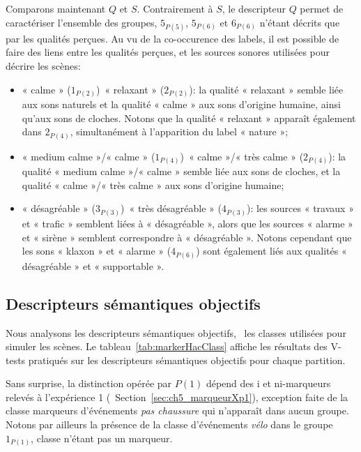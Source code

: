Comparons maintenant $Q$ et $S$. Contrairement à $S$, le descripteur $Q$ permet de caractériser l'ensemble des groupes,  $5_{P(5)}$,  $5_{P(6)}$ et  $6_{P(6)}$ n'étant décrits que par les qualités perçues. Au vu de la co-occurence des labels, il est possible de faire des liens entre les qualités perçues, et les sources sonores utilisées pour décrire les scènes:


\begin{itemize}
\item « calme » ($1_{P(2)}$)~\vs « relaxant » ($2_{P(2)}$): la qualité « relaxant » semble liée aux sons naturels et la qualité « calme » aux sons d'origine humaine, ainsi qu'aux sons de cloches. Notons que la qualité « relaxant » apparaît également dans $2_{P(4)}$, simultanément à l'apparition du label « nature »;
\item « medium calme »/« calme » ($1_{P(4)}$)~\vs « calme »/« très calme » ($2_{P(4)}$): la qualité « medium calme »/« calme » semble liée aux sons de cloches, et la qualité « calme »/« très calme » aux sons d'origine humaine;
\item « désagréable » ($3_{P(3)}$)~\vs « très désagréable » ($4_{P(3)}$): les sources « travaux » et « trafic » semblent liées à « désagréable », alors que les sources « alarme » et « sirène » semblent correspondre à « désagréable ». Notons cependant que les sons « klaxon » et « alarme » ($4_{P(6)}$) sont également liés aux qualités « désagréable » et « supportable ».
\end{itemize}

\subsection{Descripteurs sémantiques objectifs}

Nous analysons les descripteurs sémantiques objectifs, \ie~les classes utilisées pour simuler les scènes. Le tableau~\ref{tab:markerHacClass} affiche les résultats des V-tests pratiqués sur les descripteurs sémantiques objectifs pour chaque partition.

Sans surprise, la distinction opérée par $P(1)$ dépend des i et ni-marqueurs relevés à l'expérience 1 (\cf~Section~\ref{sec:ch5_marqueurXp1}), exception faite de la classe marqueurs d'événements \emph{pas chaussure} qui n'apparaît dans aucun groupe. Notons par ailleurs la présence de la classe d'événements \emph{vélo} dans le groupe $1_{P(1)}$, classe n'étant pas un marqueur.

